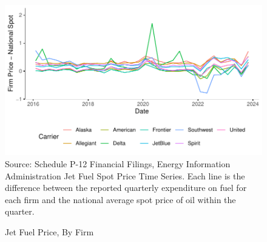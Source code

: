 \documentclass{article}
\begin{document}
\begin{appendices}
\begin{figure}
	\caption{Jet Fuel Price, By Firm}
	\label{fig:JetFuel}
	\includegraphics[width = \linewidth]{Fuel_Price_Compare}
	\footnotesize{Source: Schedule P-12 Financial Filings, Energy Information Administration Jet Fuel Spot Price Time Series. Each line is the difference between the reported quarterly expenditure on fuel for each firm and the national average spot price of oil within the quarter.}
\end{figure}


\end{appendices}
\end{document}

